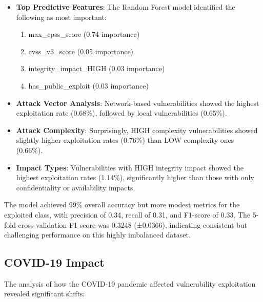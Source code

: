 \documentclass[runningheads]{llncs}
\begin{document}
\begin{itemize}
    \item \textbf{Top Predictive Features}: The Random Forest model identified the following as most important:
    \begin{enumerate}
        \item max\_epss\_score (0.74 importance)
        \item cvss\_v3\_score (0.05 importance)
        \item integrity\_impact\_HIGH (0.03 importance)
        \item has\_public\_exploit (0.03 importance)
    \end{enumerate}
    
    \item \textbf{Attack Vector Analysis}: Network-based vulnerabilities showed the highest exploitation rate (0.68\%), followed by local vulnerabilities (0.65\%).
    
    \item \textbf{Attack Complexity}: Surprisingly, HIGH complexity vulnerabilities showed slightly higher exploitation rates (0.76\%) than LOW complexity ones (0.66\%).
    
    \item \textbf{Impact Types}: Vulnerabilities with HIGH integrity impact showed the highest exploitation rates (1.14\%), significantly higher than those with only confidentiality or availability impacts.
\end{itemize}

The model achieved 99\% overall accuracy but more modest metrics for the exploited class, with precision of 0.34, recall of 0.31, and F1-score of 0.33. The 5-fold cross-validation F1 score was 0.3248 (±0.0366), indicating consistent but challenging performance on this highly imbalanced dataset.

\subsection{COVID-19 Impact}
The analysis of how the COVID-19 pandemic affected vulnerability exploitation revealed significant shifts:
\end{document}
